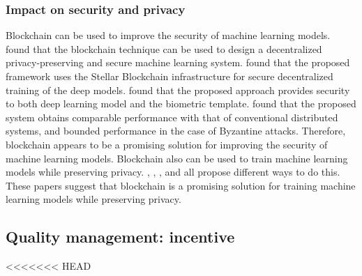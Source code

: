 \documentclass{article}
\begin{document}
\subsubsection{Impact on security and privacy}
Blockchain can be used to improve the security of machine learning models. \cite{chen_2020} found that the blockchain technique can be used to design a decentralized privacy-preserving and secure machine learning system. \cite{fadaeddini_2019} found that the proposed framework uses the Stellar Blockchain infrastructure for secure decentralized training of the deep models. \cite{goel_2019} found that the proposed approach provides security to both deep learning model and the biometric template. \cite{wang_ai_2020} found that the proposed system obtains comparable performance with that of conventional distributed systems, and bounded performance in the case of Byzantine attacks. Therefore, blockchain appears to be a promising solution for improving the security of machine learning models.\newline
Blockchain also can be used to train machine learning models while preserving privacy. \cite{ladia_2019}, \cite{kim_2019}, \cite{chen_2018}, and \cite{weng_2019} all propose different ways to do this. These papers suggest that blockchain is a promising solution for training machine learning models while preserving privacy.

\subsection{Quality management: incentive}
<<<<<<< HEAD
\end{document}
